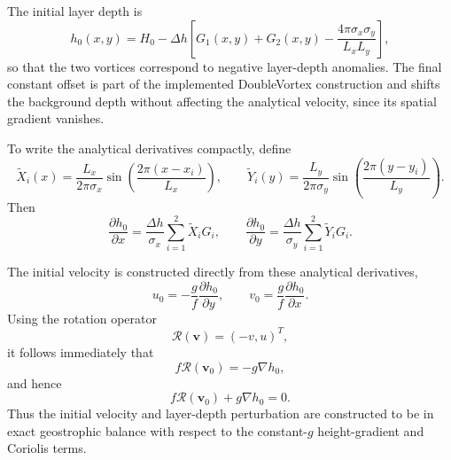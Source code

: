 \documentclass[12pt]{article}
\begin{document}
The initial layer depth is
\begin{equation}
	h_0(x,y)
	=
	H_0
	-
	\Delta h
	\left[
	G_1(x,y)+G_2(x,y)
	-
	\frac{4\pi\sigma_x\sigma_y}{L_xL_y}
	\right],
	\label{eq:doublevortex_height}
\end{equation}
so that the two vortices correspond to negative layer-depth anomalies. The final constant offset is part of the implemented DoubleVortex construction and shifts the background depth without affecting the analytical velocity, since its spatial gradient vanishes.

To write the analytical derivatives compactly, define
\begin{equation}
	\widetilde X_i(x)
	=
	\frac{L_x}{2\pi\sigma_x}
	\sin\!\left(
	\frac{2\pi(x-x_i)}{L_x}
	\right),
	\qquad
	\widetilde Y_i(y)
	=
	\frac{L_y}{2\pi\sigma_y}
	\sin\!\left(
	\frac{2\pi(y-y_i)}{L_y}
	\right).
\end{equation}
Then
\begin{equation}
	\frac{\partial h_0}{\partial x}
	=
	\frac{\Delta h}{\sigma_x}
	\sum_{i=1}^{2}
	\widetilde X_i G_i,
	\qquad
	\frac{\partial h_0}{\partial y}
	=
	\frac{\Delta h}{\sigma_y}
	\sum_{i=1}^{2}
	\widetilde Y_i G_i.
	\label{eq:doublevortex_height_derivatives}
\end{equation}

The initial velocity is constructed directly from these analytical
derivatives,
\begin{equation}
	u_0
	=
	-\frac{g}{f}
	\frac{\partial h_0}{\partial y},
	\qquad
	v_0
	=
	\frac{g}{f}
	\frac{\partial h_0}{\partial x}.
	\label{eq:doublevortex_velocity}
\end{equation}
Using the rotation operator
\begin{equation}
	\mathcal{R}(\mathbf{v})=(-v,u)^T,
\end{equation}
it follows immediately that
\begin{equation}
	f\mathcal{R}(\mathbf{v}_0)
	=
	-g\nabla h_0,
\end{equation}
and hence
\begin{equation}
	f\mathcal{R}(\mathbf{v}_0)
	+
	g\nabla h_0
	=
	0.
	\label{eq:doublevortex_geostrophic_balance}
\end{equation}
Thus the initial velocity and layer-depth perturbation are constructed to be
in exact geostrophic balance with respect to the constant-$g$ height-gradient
and Coriolis terms.
\end{document}
